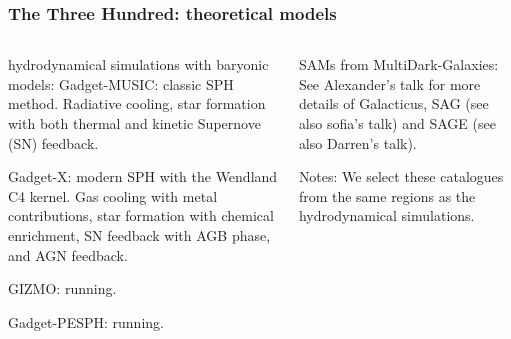 \documentclass[aspectratio=1610]{beamer}
\begin{document}
\begin{frame}
  \frametitle{The Three Hundred: theoretical models}
  \begin{columns}[t]
    \begin{column}{0.55\textwidth}
      \begin{block}{hydrodynamical simulations with baryonic models:}
        {\sc Gadget-\alert{MUSIC}}: classic SPH method. Radiative cooling, star formation with both thermal and kinetic Supernove (SN) feedback.

        {\sc Gadget-\alert{X}}: modern SPH with the Wendland C4 kernel. Gas cooling with metal contributions, star formation with chemical enrichment, SN feedback with AGB phase, and AGN feedback.

        {\sc GIZMO:} running.

        {\sc Gadget-PESPH:} running.
      \end{block}
    \end{column}
    \begin{column}{0.4\textwidth}
      \begin{block}{SAMs from MultiDark-Galaxies:}
        See Alexander's talk for more details of {\sc Galacticus}, {\sc SAG} (see also sofia's talk) and {\sc SAGE} (see also Darren's talk).

        Notes: We select these catalogues from the same regions as the hydrodynamical simulations.
      \end{block}
    \end{column}
  \end{columns}
\end{frame}


\end{document}
